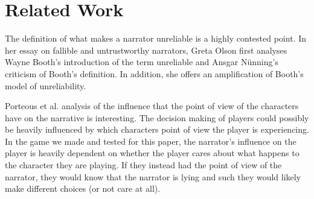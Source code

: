 \section{Related Work}
The definition of what makes a narrator unreliable is a highly contested point. In her essay on fallible and untrustworthy narrators, Greta Olson first analyses Wayne Booth's introduction of the term unreliable and Ansgar N\"unning's criticism of Booth's definition. In addition, she offers an amplification of Booth's model of unreliability\cite{Olson}.

Porteous et al. \cite{Porteous} analysis of the influence that the point of view of the characters have on the narrative is interesting. The decision making of players could possibly be heavily influenced by which characters point of view the player is experiencing. In the game we made and tested for this paper, the narrator's influence on the player is heavily dependent on whether the player cares about what happens to the character they are playing. If they instead had the point of view of the narrator, they would know that the narrator is lying and such they would likely make different choices (or not care at all).